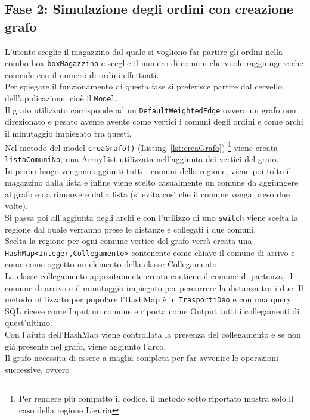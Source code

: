 \documentclass[a4paper,12pt]{report}
\begin{document}
\subsection{Fase 2: Simulazione degli ordini con creazione grafo}
L'utente sceglie il magazzino dal quale si vogliono far partire gli ordini nella combo box \texttt{boxMagazzino} e sceglie il numero di comuni che vuole raggiungere che coincide con il numero di ordini effettuati.\\
Per spiegare il funzionamento di questa fase si preferisce partire dal cervello dell'applicazione, cioè il \texttt{Model}.\\
Il grafo utilizzato corrisponde ad un \texttt{DefaultWeightedEdge} ovvero un grafo non direzionato e pesato avente
avente come vertici i comuni degli ordini e come archi il minutaggio impiegato tra questi.\\
Nel metodo del model \texttt{creaGrafo()} (Listing~\ref{lst:creaGrafo}) \footnote{Per rendere più compatto il codice, il metodo sotto riportato mostra solo il caso della regione Liguria} viene creata \texttt{listaComuniNo}, una ArrayList utilizzata nell'aggiunta
dei vertici del grafo.\\
In primo luogo vengono aggiunti tutti i comuni della regione, viene poi tolto il magazzino dalla lista e infine viene scelto casualmente un comune da aggiungere al grafo e da rimuovere dalla  lista (si evita così che il comune venga preso due volte).\\
Si passa poi all'aggiunta degli archi e con l'utilizzo di uno \texttt{switch} viene scelta la regione dal quale verranno prese le distanze e collegati i due comuni.\\
Scelta la regione per ogni comune-vertice del grafo verrà creata una\\ \texttt{HashMap<Integer,Collegamento>}
contenente come chiave il comune di arrivo e come come oggetto un elemento della classe Collegamento.\\
La classe collegamento appositamente creata contiene il comune di partenza, il comune di arrivo 
e il minutaggio impiegato per percorrere la distanza tra i due.
Il metodo utilizzato per popolare l'HashMap è in \texttt{TrasportiDao} e con una query SQL riceve come
Input un comune e riporta come Output tutti i collegamenti di quest'ultimo.\\
Con l'aiuto dell'HashMap viene controllata la presenza del collegamento e se non già presente nel
grafo, viene aggiunto l'arco.\\
Il grafo necessita di essere a maglia completa per far avvenire le operazioni successive, ovvero
\end{document}
